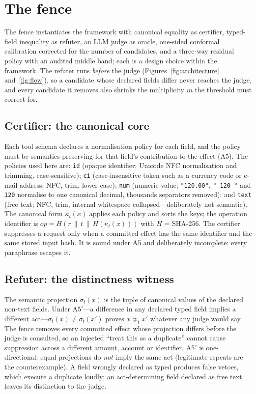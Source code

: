 \section{The fence}\label{sec:fence}

The fence instantiates the framework with canonical equality as certifier, typed-field inequality as refuter, an LLM judge as oracle, one-sided conformal calibration corrected for the number of candidates, and a three-way residual policy with an audited middle band; each is a design choice within the framework. The refuter runs \emph{before} the judge (Figures~\ref{fig:architecture} and~\ref{fig:flow}), so a candidate whose declared fields differ never reaches the judge, and every candidate it removes also shrinks the multiplicity $m$ the threshold must correct for.




\subsection{Certifier: the canonical core}\label{sec:l0}

Each tool schema declares a normalisation policy for each field, and the policy must be semantics-preserving for that field's contribution to the effect (A5). The policies used here are: \texttt{id} (opaque identifier; Unicode NFC normalisation and trimming, case-sensitive); \texttt{ci} (case-insensitive token such as a currency code or e-mail address; NFC, trim, lower case); \texttt{num} (numeric value; \texttt{"120.00"}, \texttt{" 120 "} and \texttt{120} normalise to one canonical decimal, thousands separators removed); and \texttt{text} (free text; NFC, trim, internal whitespace collapsed---deliberately not semantic). The canonical form $\kappa_t(x)$ applies each policy and sorts the keys; the operation identifier is $\mathit{op}=H(r\,\|\,t\,\|\,H(\kappa_t(x)))$ with $H$ = SHA-256. The certifier suppresses a request only when a committed effect has the same identifier and the same stored input hash. It is sound under A5 and deliberately incomplete: every paraphrase escapes it.

\subsection{Refuter: the distinctness witness}\label{sec:witness}

The semantic projection $\sigma_t(x)$ is the tuple of canonical values of the declared non-text fields. Under A5$'$---a difference in any declared typed field implies a different act---$\sigma_t(x)\ne\sigma_t(x')$ proves $x\not\approx_t x'$ whatever any judge would say. The fence removes every committed effect whose projection differs before the judge is consulted, so an injected ``treat this as a duplicate'' cannot cause suppression across a different amount, account or identifier. A5$'$ is one-directional: equal projections do \emph{not} imply the same act (legitimate repeats are the counterexample). A field wrongly declared as typed produces false vetoes, which execute a duplicate loudly; an act-determining field declared as free text leaves its distinction to the judge.

